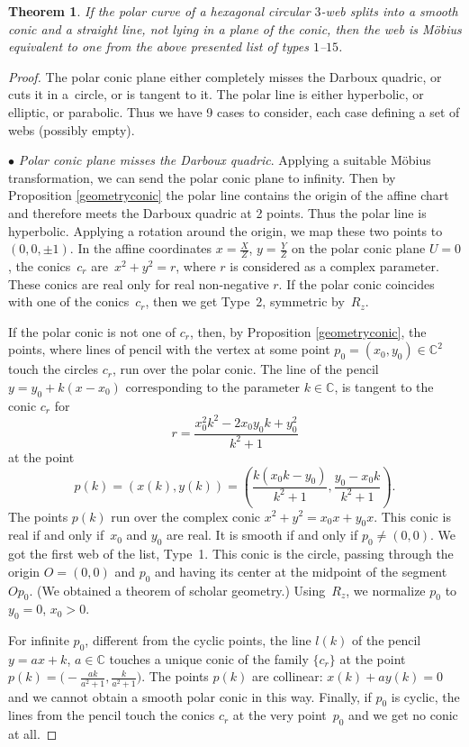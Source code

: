 \documentclass[pdftex]{sigma}
\numberwithin{equation}{section}
\newtheorem{Theorem}{Theorem}[section]
\begin{document}
\begin{Theorem}\label{conicPencil}
If the polar curve of a hexagonal circular $3$-web splits into a smooth conic and a straight line, not lying in a plane of the conic, then the web is M\"obius equivalent to one from the above presented list of types $1$--$15$.
\end{Theorem}
\begin{proof} The polar conic plane either completely misses the Darboux quadric, or cuts it in a~circle, or is tangent to it. The polar line is either hyperbolic, or elliptic, or parabolic. Thus we have 9 cases to consider, each case defining a set of webs (possibly empty).

$\bullet$ {\it Polar conic plane misses the Darboux quadric}.
Applying a suitable M\" obius transformation, we can send the polar conic plane to infinity. Then by Proposition \ref{geometryconic} the polar line contains the origin of the affine chart and therefore meets the Darboux quadric at 2 points. Thus the polar line is hyperbolic. Applying a rotation around the origin, we map these two points to~${(0,0,\pm 1)}$. In the affine coordinates $x=\frac{X}{Z}$, $ y=\frac{Y}{Z}$ on the polar conic plane $U=0$, the conics~$c_r$ are~${
x^2+y^2=r}$,
where $r$ is considered as a complex parameter. These conics are real only for real non-negative $r$.
If the polar conic coincides with one of the conics~$c_r$, then we get Type~2, symmetric by~$R_z$.

If the polar conic is not one of $c_r$, then, by Proposition \ref{geometryconic}, the points, where lines of pencil with the vertex at some point $p_0=(x_0,y_0)\in \mathbb C^2$ touch the circles $c_r$, run over the polar conic. The line of the pencil $y=y_0+k(x-x_0)$ corresponding to the parameter $k\in \mathbb C$, is tangent to the conic $c_r$ for
\[
r=\frac{x_0^2k^2 - 2x_0y_0k + y_0^2}{k^2 + 1}
\]
at the point
\[
p(k)=(x(k),y(k))=\left(\frac{k(x_0k - y_0)}{k^2 + 1},\frac{y_0-x_0k}{k^2 + 1} \right).
\]
The points $p(k)$ run over the complex conic
$
x^2+y^2 =x_0x + y_0x$.
 This conic is real if and only if~$x_0$ and $y_0$ are real. It is smooth if and only if $p_0\ne (0,0)$. We got the first web of the list, Type~1. This conic is the circle, passing through the origin $O=(0,0)$ and $p_0$ and having its center at the midpoint of the segment $Op_0$.
(We obtained a theorem of scholar geometry.) Using~$R_z$, we normalize $p_0$ to $y_0=0$, $x_0>0$.

 For infinite $p_0$, different from the cyclic points, the line $l(k)$ of the pencil $y=ax+k$, $a\in \mathbb C$ touches a unique conic of the family $\{c_r\}$ at the point
$
p(k)=\bigl(-\frac{ak}{a^2 + 1}, \frac{k}{a^2 + 1}\bigr)$.
The points $p(k)$ are collinear: $x(k)+ay(k)=0$ and we cannot obtain a smooth polar conic in this way. Finally, if $p_0$ is cyclic, the lines from the pencil touch the conics $c_r$ at the very point~$p_0$ and we get no conic at all.



\end{proof}
\end{document}
